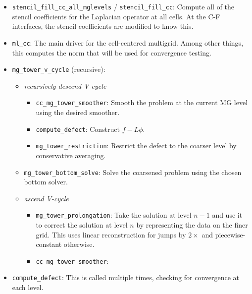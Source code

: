 \begin{itemize}

\item {\tt stencil\_fill\_cc\_all\_mglevels} / {\tt stencil\_fill\_cc}:
  Compute all of the stencil coefficients
  for the Laplacian operator at all cells.  At the C-F interfaces, the
  stencil coefficients are modified to know this.

\item {\tt ml\_cc}: The main driver for the cell-centered multigrid.
   Among other things, this computes the norm that will be used
   for convergence testing.

\item {\tt mg\_tower\_v\_cycle} (recursive):
\begin{itemize}

  \item {\em recursively descend V-cycle}

  \begin{itemize} 
  \item {\tt cc\_mg\_tower\_smoother}: Smooth the 
    problem at the current MG level using the desired smoother.

  \item {\tt compute\_defect}: Construct $f - L\phi$.

  \item {\tt mg\_tower\_restriction}:  Restrict
    the defect to the coarser level by conservative averaging.
  \end{itemize}

  \item {\tt mg\_tower\_bottom\_solve}:  Solve the coarsened problem
    using the chosen bottom solver.

  \item {\em ascend V-cycle}

  \begin{itemize}
  \item {\tt mg\_tower\_prolongation}: Take the solution at level $n-1$ and use it to 
     correct the solution at level $n$ by representing the data on the finer grid.  This uses
     linear reconstruction for jumps by $2\times$ and piecewise-constant otherwise.

  \item {\tt cc\_mg\_tower\_smoother}:
  \end{itemize}

\end{itemize}
\item {\tt compute\_defect}: This is called multiple times, checking for
   convergence at each level.


\end{itemize}



